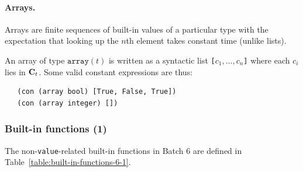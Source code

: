 \paragraph{Arrays.}
Arrays are finite sequences of built-in values of a particular type with the
expectation that looking up the $n$th element takes constant time (unlike
lists).

An array of type $\texttt{array}(t)$ is written as a syntactic list
\texttt{[$c_1, \ldots, c_n$]} where each $c_i$ lies in $\mathbf{C}_t$.
Some valid constant expressions are thus:
\begin{verbatim}
   (con (array bool) [True, False, True])
   (con (array integer) [])
\end{verbatim}

\subsubsection{Built-in functions (1)}
\label{sec:built-in-functions-6-1}
The non-\texttt{value}-related built-in functions in Batch 6 are defined in
Table~\ref{table:built-in-functions-6-1}.

